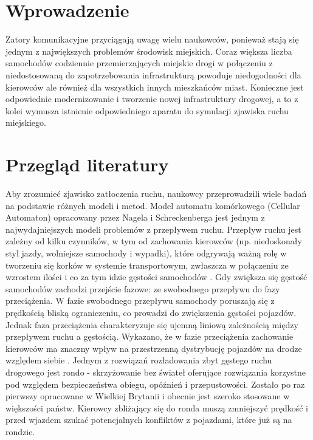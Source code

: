 \documentclass[a4paper,12pt]{article}
\begin{document}
\section{Wprowadzenie}

Zatory komunikacyjne przyciągają uwagę wielu naukowców, ponieważ stają się jednym z największych problemów środowisk miejskich. Coraz większa liczba samochodów codziennie przemierzających miejskie drogi w połączeniu z niedostosowaną do zapotrzebowania infrastrukturą powoduje niedogodności dla kierowców ale również dla wszystkich innych mieszkańców miast. Konieczne jest odpowiednie modernizowanie i tworzenie nowej infrastruktury drogowej, a to z kolei wymusza istnienie odpowiedniego aparatu do symulacji zjawiska ruchu miejskiego.
		
\section{Przegląd literatury}

Aby zrozumieć zjawisko zatłoczenia ruchu, naukowcy przeprowadzili wiele badań na podstawie różnych modeli i metod. Model automatu komórkowego (Cellular Automaton) opracowany przez Nagela i Schreckenberga \cite{nagel1992cellular} jest jednym z najwydajniejszych modeli problemów z przepływem ruchu.
Przepływ ruchu jest zależny od kilku czynników, w tym od zachowania kierowców (np. niedoskonały styl jazdy, wolniejsze samochody i wypadki), które odgrywają ważną rolę w tworzeniu się korków w systemie transportowym, zwłaszcza w połączeniu ze wzrostem ilości i co za tym idzie gęstości samochodów \cite{chowdhury2000statistical}. Gdy zwiększa się gęstość samochodów zachodzi przejście fazowe: ze swobodnego przepływu do fazy przeciążenia. W fazie swobodnego przepływu samochody poruszają się z prędkością bliską ograniczeniu, co prowadzi do zwiększenia gęstości pojazdów. Jednak faza przeciążenia charakteryzuje się ujemną liniową zależnością między przepływem ruchu a gęstością. Wykazano, że w fazie przeciążenia zachowanie kierowców ma znaczny wpływ na przestrzenną dystrybucję pojazdów na drodze
względem siebie \cite{jarai2012earthquake}.
Jednym z rozwiązań rozładowania zbyt gęstego ruchu drogowego jest rondo - skrzyżowanie bez świateł oferujące rozwiązania
korzystne pod względem bezpieczeństwa obiegu, opóźnień i przepustowości. Zostało po raz pierwszy opracowane w Wielkiej Brytanii i obecnie jest szeroko stosowane w
większości państw. Kierowcy zbliżający się do ronda muszą zmniejszyć prędkość i przed wjazdem szukać potencjalnych konfliktów z pojazdami, które już są na rondzie.
\end{document}
